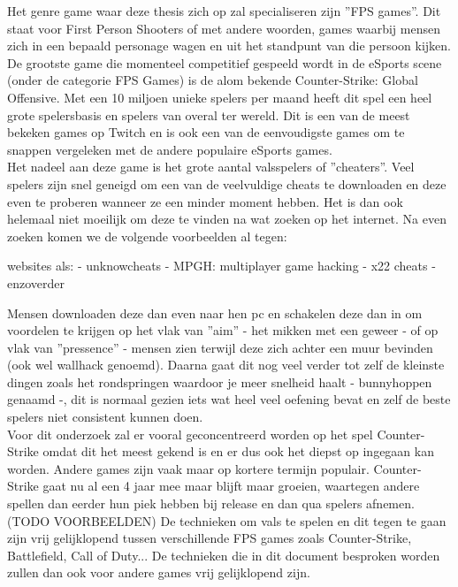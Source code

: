 \documentclass[pdftex,a4paper,12pt,twoside]{report}
\begin{document}
Het genre game waar deze thesis zich op zal specialiseren zijn ''FPS games''. Dit staat voor First Person Shooters of met andere woorden, games waarbij mensen zich in een bepaald personage wagen en uit het standpunt van die persoon kijken. De grootste game die momenteel competitief gespeeld wordt in de eSports scene (onder de categorie FPS Games) is de alom bekende Counter-Strike: Global Offensive. 
 Met een 10 miljoen unieke spelers per maand heeft dit spel een heel grote spelersbasis en spelers van overal ter wereld. Dit is een van de meest bekeken games op Twitch en is ook een van de eenvoudigste games om te snappen vergeleken met de andere populaire eSports games. \citep{csgoblog}
\\

Het nadeel aan deze game is het grote aantal valsspelers of ''cheaters''. Veel spelers zijn snel geneigd om een van de veelvuldige cheats te downloaden en deze even te proberen wanneer ze een minder moment hebben. Het is dan ook helemaal niet moeilijk om deze te vinden na wat zoeken op het internet. Na even zoeken komen we de volgende voorbeelden al tegen:

websites als: 
- unknowcheats
- MPGH: multiplayer game hacking
- x22 cheats 
- enzoverder

 Mensen downloaden deze dan even naar hen pc en schakelen deze dan in om voordelen te krijgen op het vlak van ''aim'' - het mikken met een geweer - of op vlak van ''pressence'' - mensen zien terwijl deze zich achter een muur bevinden (ook wel wallhack genoemd). Daarna gaat dit nog veel verder tot zelf de kleinste dingen zoals het rondspringen waardoor je meer snelheid haalt - bunnyhoppen genaamd -, dit is normaal gezien iets wat heel veel oefening bevat en zelf de beste spelers niet consistent kunnen doen. 
\\

Voor dit onderzoek zal er vooral geconcentreerd worden op het spel Counter-Strike omdat dit het meest gekend is en er dus ook het diepst op ingegaan kan worden. Andere games zijn vaak maar op kortere termijn populair. Counter-Strike gaat nu al een 4 jaar mee maar blijft maar groeien, waartegen andere spellen dan eerder hun piek hebben bij release en dan qua spelers afnemen. (TODO VOORBEELDEN) De technieken om vals te spelen en dit tegen te gaan zijn vrij gelijklopend tussen verschillende FPS games zoals Counter-Strike, Battlefield, Call of Duty... De technieken die in dit document besproken worden zullen dan ook voor andere games vrij gelijklopend zijn.
\\
\end{document}
